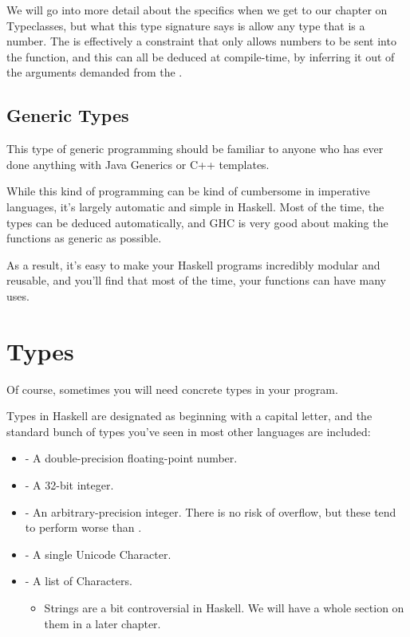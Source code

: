 We will go into more detail about the specifics when we get to our chapter on Typeclasses, but what this type signature says is allow any type  that is a number. The  is effectively a constraint that only allows numbers to be sent into the function, and this can all be deduced at compile-time, by inferring it out of the arguments demanded from the \inlinecode{*}. 

\subsection{Generic Types}
This type of generic programming should be familiar to anyone who has ever done anything with Java Generics or C++ templates. 

While this kind of programming can be kind of cumbersome in imperative languages, it's largely automatic and simple in Haskell.  Most of the time, the types can be deduced automatically, and GHC is very good about making the functions as generic as possible.  

As a result, it's easy to make your Haskell programs incredibly modular and reusable, and you'll find that most of the time, your functions can have many uses.  

\section{Types}
Of course, sometimes you will need concrete types in your program.  

Types in Haskell are designated as beginning with a capital letter, and the standard bunch of types you've seen in most other languages are included: 

\begin{itemize}
\item {} - A double-precision floating-point number. 
\item {} - A 32-bit integer. 
\item {} - An arbitrary-precision integer.  There is no risk of overflow, but these tend to perform worse than . 
\item {} - A single Unicode Character. 
\item {} - A list of Characters. \begin{itemize}
            \item Strings are a bit controversial in Haskell.  We will have a whole section on them in a later chapter. 
	\end{itemize}
\end{itemize}
